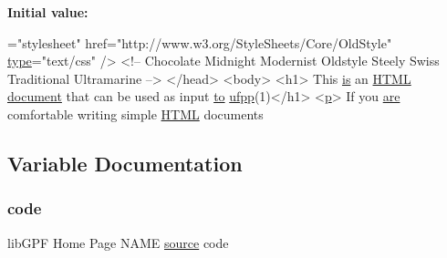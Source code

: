 {\bfseries Initial value\+:}
\begin{DoxyCode}
=\textcolor{stringliteral}{"stylesheet"} href=\textcolor{stringliteral}{"http://www.w3.org/StyleSheets/Core/OldStyle"} \hyperlink{create__watch_83_8txt_a6036c8b9d18bd95ef0feb888982faa0b}{type}=\textcolor{stringliteral}{"text/css"} />
           <!-- Chocolate Midnight Modernist Oldstyle Steely Swiss Traditional Ultramarine -->
        </head>
        <body>
        <h1> This \hyperlink{M__journal_83_8txt_af78cd777fb46433462e3afacb9c375fd}{is} an \hyperlink{notes_8txt_a5589c3717ecf4ab40eee95e236b19dad}{HTML} \hyperlink{namespacem__fpp_a36ad74639f1f01dd0ac08e59e6943778}{document} that can be used as input \hyperlink{M__stopwatch_83_8txt_a97209fd3e34ef701c0a9734280779cbb}{to} 
      \hyperlink{ufpp__overview_81_8txt_a97c20a96bcab81bc74c9d64b001f1202}{ufpp}(1)</h1>
        <\hyperlink{namespacem__writegif_a34d3a64b1381a281909da380d922d770}{p}>
            If you \hyperlink{M__stopwatch_83_8txt_a5040be02b832eba08820289c8a1f81c4}{are} comfortable writing simple \hyperlink{notes_8txt_a5589c3717ecf4ab40eee95e236b19dad}{HTML} documents
\end{DoxyCode}


\subsection{Variable Documentation}
\mbox{\label{ufpp__overview_81_8txt_a74a0615f2d9c4a398d9126096f8092f8}} 
\subsubsection{\texorpdfstring{code}{code}}
{\footnotesize\ttfamily lib\+G\+PF Home Page N\+A\+ME \hyperlink{ufpp__overview_81_8txt_a4d6669ece605d05985c83a04dd38e0ad}{source} code}

\mbox{\label{ufpp__overview_81_8txt_a5673f2294ff1627be40c90eae33141ca}} 
